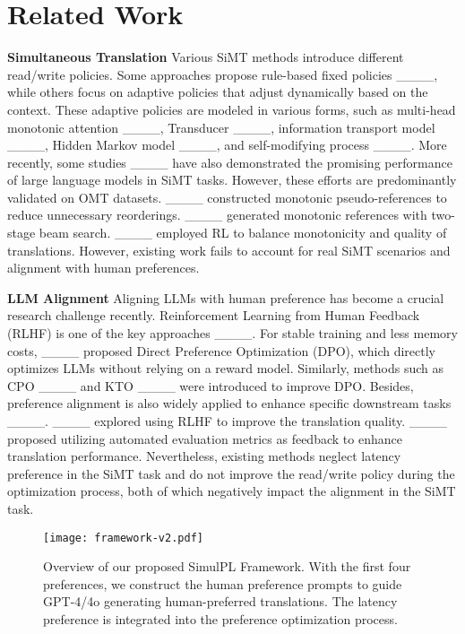 \section{Related Work}
\noindent\textbf{Simultaneous Translation}
Various SiMT methods introduce different read/write policies. Some approaches propose rule-based fixed policies ____, while others focus on adaptive policies that adjust dynamically based on the context. These adaptive policies are modeled in various forms, such as multi-head monotonic attention ____, Transducer ____, information transport model ____, Hidden Markov model ____, and self-modifying process ____. More recently, some studies ____ have also demonstrated the promising performance of large language models in SiMT tasks. However, these efforts are predominantly validated on OMT datasets. ____ constructed monotonic pseudo-references to reduce unnecessary reorderings. ____ generated monotonic references with two-stage beam search. ____ employed RL to balance monotonicity and quality of translations. However, existing work fails to account for real SiMT scenarios and alignment with human preferences.

\noindent\textbf{LLM Alignment} Aligning LLMs with human preference has become a crucial research challenge recently. Reinforcement Learning from Human Feedback (RLHF) is one of the key approaches ____. For stable training and less memory costs, ____ proposed Direct Preference Optimization (DPO), which directly optimizes LLMs without relying on a reward model. Similarly, methods such as CPO ____ and KTO ____ were introduced to improve DPO. Besides, preference alignment is also widely applied to enhance specific downstream tasks ____. ____ explored using RLHF to improve the translation quality. ____ proposed utilizing automated evaluation metrics as feedback to enhance translation performance. Nevertheless, existing methods neglect latency preference in the SiMT task and do not improve the read/write policy during the optimization process, both of which negatively impact the alignment in the SiMT task.

\begin{figure}[t]
	\centering
	\small
        \texttt{[image: framework-v2.pdf]}
        \vspace{-0.2in}
	\caption{Overview of our proposed SimulPL Framework. With the first four preferences, we construct the human preference prompts to guide GPT-4/4o generating human-preferred translations. The latency preference is integrated into the preference optimization process.}
 \vspace{-0.2in}
	\label{simulpl-framework}
    \end{figure}